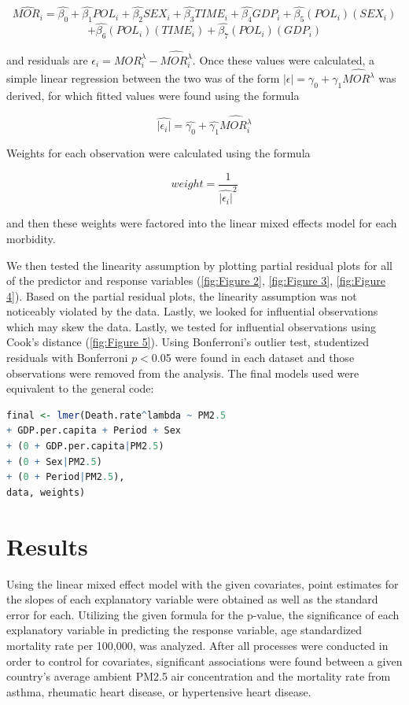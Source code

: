 \documentclass[12pt, letterpaper, twoside]{article}\usepackage[]{graphicx}\usepackage[]{xcolor}
\begin{document}
\[
  \hat{MOR_i} = \hat{\beta_{0}} + \hat{\beta_{1}}POL_i + \hat{\beta_{2}}SEX_i +
  \hat{\beta_{3}}TIME_i +\hat{\beta_{4}}GDP_i + \hat{\beta_{5}}(POL_i)(SEX_i)
\]
\[
+ \hat{\beta_{6}}(POL_i)(TIME_i) + \hat{\beta_{7}}(POL_i)(GDP_i)
\]

and residuals are \begin{math}\epsilon_i = MOR_i^{\lambda}-\hat{MOR_i^{\lambda}}
\end{math}. Once these values were calculated, a simple linear regression between
the two was of the form \begin{math}|\epsilon| = \gamma_0 + \gamma_1\hat{MOR^
{\lambda}}\end{math} was derived, for which fitted values were found using the
formula

\[
\hat{|\epsilon_i|} = \hat{\gamma_0} + \hat{\gamma_1}\hat{MOR_i^
{\lambda}}
\]

\par Weights for each observation were calculated using the formula

\[
weight = \frac{1}{\hat{|\epsilon_i|}^2}
\]

and then these weights were factored into the linear mixed effects model for
each morbidity.
\par We then tested the linearity assumption by plotting partial
residual plots for all of the predictor and response variables
(\autoref{fig:Figure 2}, \autoref{fig:Figure 3}, \autoref{fig:Figure 4}). Based
on the partial residual plots, the linearity assumption was not noticeably
violated by the data. Lastly, we looked for influential observations which may
skew the data. Lastly, we tested for influential observations using Cook's
distance (\autoref{fig:Figure 5}). Using Bonferroni's outlier test, studentized
residuals with Bonferroni \begin{math}p < \end{math}0.05 were found in each
dataset and those observations were removed from the analysis. The final models
used were equivalent to the general code:

\begin{lstlisting}[language=R]
final <- lmer(Death.rate^lambda ~ PM2.5
+ GDP.per.capita + Period + Sex
+ (0 + GDP.per.capita|PM2.5)
+ (0 + Sex|PM2.5)
+ (0 + Period|PM2.5),
data, weights)
\end{lstlisting}

\section*{Results}
Using the linear mixed effect model with the given covariates, point estimates
for the slopes of each explanatory variable were obtained as well as the standard
error for each. Utilizing the given formula for the p-value, the significance of
each explanatory variable in predicting the response variable, age standardized
mortality rate per 100,000, was analyzed. After all processes were
conducted in order to control for covariates, significant associations were
found between a given country's average ambient PM2.5 air concentration and
the mortality rate from asthma, rheumatic heart disease, or hypertensive heart
disease.\par
\end{document}
